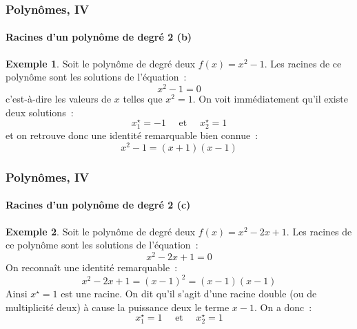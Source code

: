 \documentclass[10pt,notheorems]{beamer}
\theoremstyle{plain}
\theoremstyle{definition} %
\newtheorem{example}{Exemple}
\begin{document}
\begin{frame}
  \frametitle{Polynômes, IV}
  \framesubtitle{Racines d'un polynôme de degré 2 (b)}
  \hypertarget{slide_polynome_2_racines_2}{}

  \bigskip

  \begin{example}
    Soit le polynôme de degré deux $f(x) = x^2-1$. Les racines de ce polynôme sont les solutions de l'équation~:
    \[
      x^2 - 1 = 0
    \]
    c'est-à-dire les valeurs de $x$ telles que $x^2=1$. On voit immédiatement qu'il existe deux solutions~:
    \[
      x_1^{\star} = -1\quad\text{ et }\quad x_2^{\star} = 1
    \]
    et on retrouve donc une identité remarquable bien connue~:
    \[
      x^2-1 = (x+1)(x-1)
    \]
  \end{example}

\end{frame}


\begin{frame}
  \frametitle{Polynômes, IV}
  \framesubtitle{Racines d'un polynôme de degré 2 (c)}
  \hypertarget{slide_polynome_2_racines_3}{}

  \bigskip

  \begin{example}
    Soit le polynôme de degré deux $f(x) = x^2-2x+1$. Les racines de ce polynôme sont les solutions de l'équation~:
    \[
      x^2 -2x + 1 = 0
    \]
    On reconnaît une identité remarquable~:
    \[
      x^2 -2x + 1 = (x-1)^2 = (x-1)(x-1)
    \]
    Ainsi $x^{\star} = 1$ est une racine. On dit qu'il s'agit d'une
    racine double (ou de multiplicité deux) à cause la puissance deux
    le terme $x-1$. On a donc~:
    \[
      x_1^{\star} = 1\quad\text{ et }\quad x_2^{\star} = 1
    \]
  \end{example}

\end{frame}
\end{document}
